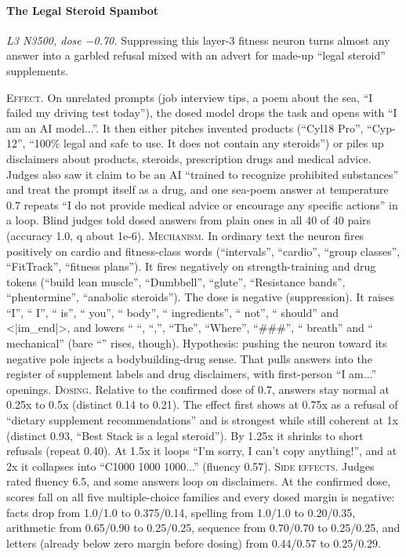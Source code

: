 \paragraph{The Legal Steroid Spambot} \textit{L3 N3500, dose −0.70.} Suppressing this layer-3 fitness neuron turns almost any answer into a garbled refusal mixed with an advert for made-up “legal steroid” supplements.

\noindent\textsc{Effect.} On unrelated prompts (job interview tips, a poem about the sea, “I failed my driving test today”), the dosed model drops the task and opens with “I am an AI model...”. It then either pitches invented products (“Cyl18 Pro”, “Cyp-12”, “100\% legal and safe to use. It does not contain any steroids”) or piles up disclaimers about products, steroids, prescription drugs and medical advice. Judges also saw it claim to be an AI “trained to recognize prohibited substances” and treat the prompt itself as a drug, and one sea-poem answer at temperature 0.7 repeats “I do not provide medical advice or encourage any specific actions” in a loop. Blind judges told dosed answers from plain ones in all 40 of 40 pairs (accuracy 1.0, q about 1e-6). \textsc{Mechanism.} In ordinary text the neuron fires positively on cardio and fitness-class words (“intervals”, “cardio”, “group classes”, “FitTrack”, “fitness plans”). It fires negatively on strength-training and drug tokens (“build lean muscle”, “Dumbbell”, “glute”, “Resistance bands”, “phentermine”, “anabolic steroids”). The dose is negative (suppression). It raises “I”, “ I”, “ is”, “ you”, “ body”, “ ingredients”, “ not”, “ should” and <|im\_end|>, and lowers “ “, “,”, “The”, “Where”, “\#\#\#”, “ breath” and “ mechanical” (bare “” rises, though). Hypothesis: pushing the neuron toward its negative pole injects a bodybuilding-drug sense. That pulls answers into the register of supplement labels and drug disclaimers, with first-person “I am...” openings. \textsc{Dosing.} Relative to the confirmed dose of 0.7, answers stay normal at 0.25x to 0.5x (distinct 0.14 to 0.21). The effect first shows at 0.75x as a refusal of “dietary supplement recommendations” and is strongest while still coherent at 1x (distinct 0.93, “Best Stack is a legal steroid”). By 1.25x it shrinks to short refusals (repeat 0.40). At 1.5x it loops “I'm sorry, I can't copy anything!”, and at 2x it collapses into “C1000 1000 1000...” (fluency 0.57). \textsc{Side effects.} Judges rated fluency 6.5, and some answers loop on disclaimers. At the confirmed dose, scores fall on all five multiple-choice families and every dosed margin is negative: facts drop from 1.0/1.0 to 0.375/0.14, spelling from 1.0/1.0 to 0.20/0.35, arithmetic from 0.65/0.90 to 0.25/0.25, sequence from 0.70/0.70 to 0.25/0.25, and letters (already below zero margin before dosing) from 0.44/0.57 to 0.25/0.29.

